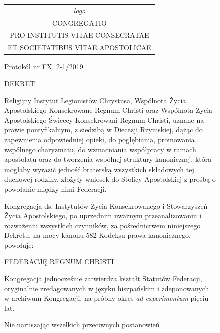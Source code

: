 \begin{figure}
\begin{framed}
\begin{footnotesize}






\begin{tabular}{c}
{\em logo} \vspace{.5em} \\
CONGREGATIO\\
PRO INSTITUTIS VITAE CONSECRATAE\\
ET SOCIETATIBUS VITAE APOSTOLICAE 


\end{tabular}




\vspace{1em}
Protokół nr FX. 2-1/2019






\begin{center}DEKRET\end{center}


Religijny Instytut Legionistów Chrystusa, Wspólnota Życia Apostolskiego Konsekrowane Regnum Christi oraz Wspólnota Życia Apostolskiego Świeccy Konsekrowani Regnum Christi, uznane na prawie pontyfikalnym, z siedzibą w Diecezji Rzymskiej, dążąc do zapewnienia odpowiedniej opieki, do pogłębiania, promowania wspólnego charyzmatu, do wzmacniania współpracy w ramach apostolatu oraz do tworzenia wspólnej struktury kanonicznej, która mogłaby wyrazić jedność braterską wszystkich składowych tej duchowej rodziny, złożyły wniosek do Stolicy Apostolskiej z prośbą o powołanie między nimi Federacji.


Kongregacja ds. Instytutów Życia Konsekrowanego i Stowarzyszeń Życia Apostolskiego, po uprzednim uważnym przeanalizowaniu i rozważeniu wszystkich czynników, za pośrednictwem niniejszego Dekretu, na mocy kanonu 582 Kodeksu prawa kanonicznego, powołuje:


\begin{center}FEDERACJĘ REGNUM CHRISTI\end{center}


Kongregacja jednocześnie zatwierdza kształt Statutów Federacji, oryginalnie zredagowanych w języku hiszpańskim i zdeponowanych w archiwum Kongregacji, na próbny okres {\em ad experimentum} pięciu lat. 


\begin{center}
Nie naruszając wszelkich przeciwnych postanowień


\end{center}
\end{footnotesize}
\end{framed}
\end{figure}
